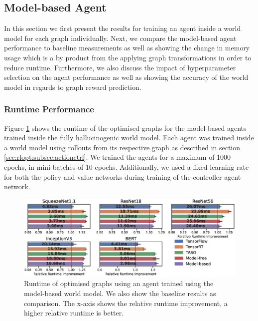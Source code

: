 \subsection{Model-based Agent}
\label{sec:eval:subsec:mbagent}

In this section we first present the results for training an agent inside a world model for each graph individually. Next, we compare the model-based agent performance to baseline measurements as well as showing the change in memory usage which is a by product from the applying graph transformations in order to reduce runtime. Furthermore, we also discuss the impact of hyperparameter selection on the agent performance as well as showing the accuracy of the world model in regards to graph reward prediction.

\subsubsection{Runtime Performance}
\label{sec:eval:subsec:mb:sec:runtimeperf}

Figure \ref{fig:eval:world-model-runtimes} shows the runtime of the optimised graphs for the model-based agents trained inside the fully hallucinogenic world model. Each agent was trained inside a world model using rollouts from its respective graph as described in section \ref{sec:rlopt:subsec:actionctrl}. We trained the agents for a maximum of 1000 epochs, in mini-batches of 10 epochs. Additionally, we used a fixed learning rate for both the policy and value networks during training of the controller agent network.

\begin{figure}[h]
  \centering
  \includegraphics[width=1\columnwidth]{sections/5evaluation/images/runtimes_all_h}
  \caption[Runtimes of optimised graphs using a model-based controller]{Runtime of optimised graphs using an agent trained using the model-based world model. We also show the baseline results as comparison. The x-axis shows the relative runtime improvement, a higher relative runtime is better.}
  \label{fig:eval:world-model-runtimes}
\end{figure}


